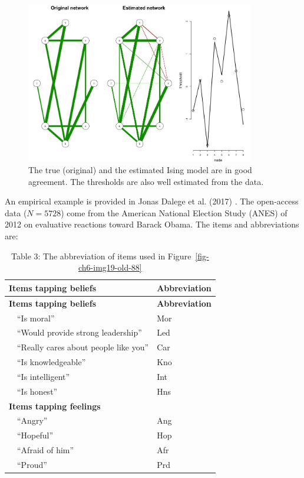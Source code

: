 \documentclass[
  letterpaper,
]{scrbook}
\begin{document}
\begin{figure}

{\centering \includegraphics[width=3.93454in,height=\textheight]{media/ch6/image18.jpg}

}

\caption{\label{fig-ch6-img18-old-87}The true (original) and the
estimated Ising model are in good agreement. The thresholds are also
well estimated from the data.}

\end{figure}

An empirical example is provided in Jonas Dalege et al. (2017) . The
open-access data (\(N = 5728\)) come from the American National Election
Study (ANES) of 2012 on evaluative reactions toward Barack Obama. The
items and abbreviations are:

\begin{longtable}[]{@{}ll@{}}
\caption{Table 3: The abbreviation of items used in
Figure~\ref{fig-ch6-img19-old-88}}\tabularnewline
\toprule\noalign{}
\textbf{Items tapping beliefs} & \textbf{Abbreviation} \\
\midrule\noalign{}
\endfirsthead
\toprule\noalign{}
\textbf{Items tapping beliefs} & \textbf{Abbreviation} \\
\midrule\noalign{}
\endhead
\bottomrule\noalign{}
\endlastfoot
 ``Is moral'' & Mor \\
 ``Would provide strong leadership'' & Led \\
 ``Really cares about people like you'' & Car \\
 ``Is knowledgeable'' & Kno \\
 ``Is intelligent'' & Int \\
 ``Is honest'' & Hns \\
\textbf{Items tapping feelings} & \\
 ``Angry'' & Ang \\
 ``Hopeful'' & Hop \\
 ``Afraid of him'' & Afr \\
 ``Proud'' & Prd \\
\end{longtable}
\end{document}

